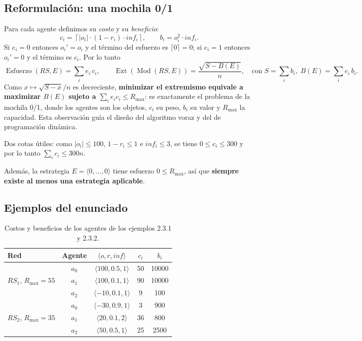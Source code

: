 \documentclass[11pt,letterpaper]{article}
\newcommand{\Ext}{\operatorname{Ext}}
\newcommand{\Esf}{\operatorname{Esfuerzo}}
\newcommand{\Mod}{\operatorname{Mod}}
\newcommand{\Rmax}{R_{\max}}
\begin{document}
\subsection{Reformulación: una mochila 0/1}
\label{sec:mochila}

Para cada agente definimos su \emph{costo} y su \emph{beneficio}:
\[
  c_i = \left\lceil |o_i|\cdot(1-r_i)\cdot inf_i \right\rceil ,
  \qquad
  b_i = o_i^2 \cdot inf_i .
\]
Si $e_i = 0$ entonces $o_i' = o_i$ y el término del esfuerzo es
$\lceil 0 \rceil = 0$; si $e_i = 1$ entonces $o_i' = 0$ y el término es $c_i$.
Por lo tanto
\[
  \Esf(RS,E) = \sum_{i} e_i\, c_i ,
  \qquad
  \Ext(\Mod(RS,E)) = \frac{\sqrt{S - B(E)}}{n},
  \quad\text{con } S = \sum_i b_i,\; B(E) = \sum_i e_i\, b_i .
\]
Como $x \mapsto \sqrt{S-x}/n$ es decreciente, \textbf{minimizar el extremismo
equivale a maximizar $B(E)$ sujeto a $\sum_i e_i c_i \le \Rmax$}: es
exactamente el problema de la mochila 0/1, donde los agentes son los objetos,
$c_i$ su peso, $b_i$ su valor y $\Rmax$ la capacidad. Esta observación guía el
diseño del algoritmo voraz y del de programación dinámica.

Dos cotas útiles: como $|o_i| \le 100$, $1-r_i \le 1$ e $inf_i \le 3$, se
tiene $0 \le c_i \le 300$ y por lo tanto $\sum_i c_i \le 300n$.

Además, la estrategia $E = \langle 0,\dots,0\rangle$ tiene esfuerzo $0 \le
\Rmax$, así que \textbf{siempre existe al menos una estrategia aplicable}.

\subsection{Ejemplos del enunciado}

\begin{table}[h]
\centering
\begin{tabular}{lcccc}
\toprule
Red & Agente & $\langle o, r, inf\rangle$ & $c_i$ & $b_i$ \\
\midrule
\multirow{3}{*}{$RS_1$, $\Rmax = 55$}
 & $a_0$ & $\langle 100, 0.5, 1\rangle$ & 50 & 10000 \\
 & $a_1$ & $\langle 100, 0.1, 1\rangle$ & 90 & 10000 \\
 & $a_2$ & $\langle -10, 0.1, 1\rangle$ & 9  & 100 \\
\midrule
\multirow{3}{*}{$RS_2$, $\Rmax = 35$}
 & $a_0$ & $\langle -30, 0.9, 1\rangle$ & 3  & 900 \\
 & $a_1$ & $\langle 20, 0.1, 2\rangle$  & 36 & 800 \\
 & $a_2$ & $\langle 50, 0.5, 1\rangle$  & 25 & 2500 \\
\bottomrule
\end{tabular}
\caption{Costos y beneficios de los agentes de los ejemplos 2.3.1 y 2.3.2.}
\label{tab:ejemplos}
\end{table}
\end{document}
